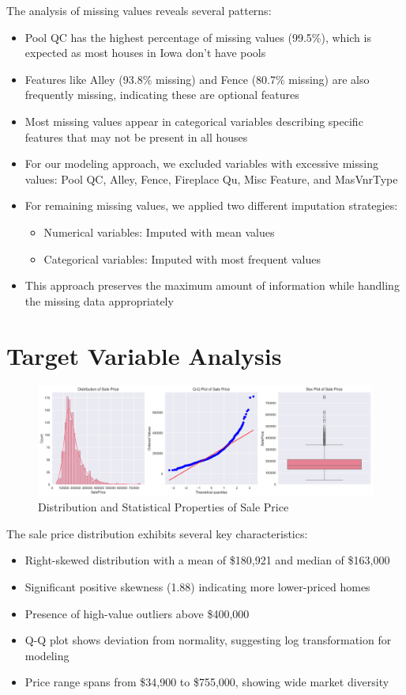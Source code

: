 \documentclass[12pt]{report}
\begin{document}
The analysis of missing values reveals several patterns:
\begin{itemize}
    \item Pool QC has the highest percentage of missing values (99.5\%), which is expected as most houses in Iowa don't have pools
    \item Features like Alley (93.8\% missing) and Fence (80.7\% missing) are also frequently missing, indicating these are optional features
    \item Most missing values appear in categorical variables describing specific features that may not be present in all houses
    \item For our modeling approach, we excluded variables with excessive missing values: Pool QC, Alley, Fence, Fireplace Qu, Misc Feature, and MasVnrType
    \item For remaining missing values, we applied two different imputation strategies:
    \begin{itemize}
        \item Numerical variables: Imputed with mean values
        \item Categorical variables: Imputed with most frequent values
    \end{itemize}
    \item This approach preserves the maximum amount of information while handling the missing data appropriately
\end{itemize}

\section{Target Variable Analysis}
\begin{figure}[H]
    \centering
    \includegraphics[width=1.0\textwidth]{figures/sale_price_distribution.png}
    \caption{Distribution and Statistical Properties of Sale Price}
    \label{fig:sale_price_dist}
\end{figure}

The sale price distribution exhibits several key characteristics:
\begin{itemize}
    \item Right-skewed distribution with a mean of \$180,921 and median of \$163,000
    \item Significant positive skewness (1.88) indicating more lower-priced homes
    \item Presence of high-value outliers above \$400,000
    \item Q-Q plot shows deviation from normality, suggesting log transformation for modeling
    \item Price range spans from \$34,900 to \$755,000, showing wide market diversity
\end{itemize}
\end{document}
